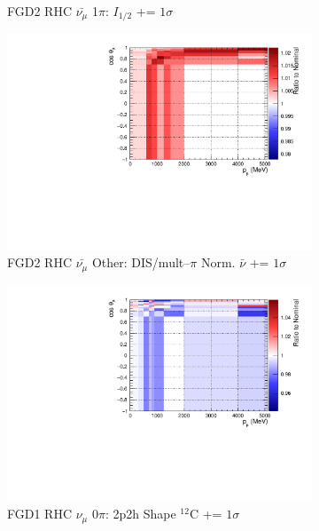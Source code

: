 \begin{figure}[!htbp]
\begin{subfigure}{.32\textwidth}
  \caption{FGD2 RHC $\bar{\nu_{\mu}}$ 1$\pi$: $I_{1/2}$ += $1\sigma$}
  \label{fig:sigvar_FGD2_anti-numuCC_1pi}
\end{subfigure}
\begin{subfigure}{.32\textwidth}
  \centering
  \includegraphics[width=0.85\linewidth]{figs/sig/FGD2_anti-numuCC_other_CC_DIS_MultPi_Norm_Nubar_+1sig.pdf}
  \caption{FGD2 RHC $\bar{\nu_{\mu}}$ Other: DIS/mult--$\pi$ Norm. $\bar{\nu}$ += $1\sigma$}
  \label{fig:sigvar_FGD2_anti-numuCC_other}
\end{subfigure}
\begin{subfigure}{.32\textwidth}
  \centering
  \includegraphics[width=0.85\linewidth]{figs/sig/FGD1_NuMuBkg_CC0pi_in_AntiNu_Mode_2p2h_shape_C_+1sig.pdf}
  \caption{FGD1 RHC $\nu_{\mu}$ 0$\pi$: 2p2h Shape $^{12}$C += $1\sigma$}
  \label{fig:sigvar_FGD1_NuMuBkg_CC0pi_in_AntiNu_Mode}
\end{subfigure}
\begin{subfigure}{.32\textwidth}
  \centering

\end{subfigure}
\end{figure}
